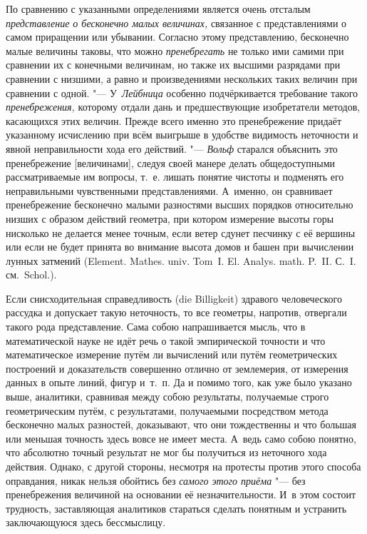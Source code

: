 По сравнению с указанными определениями является очень отсталым
{\em представление о бесконечно малых величинах,} связанное
с представлениями о самом приращении или убывании. Согласно этому представлению,
бесконечно малые величины таковы, что можно
{\em пренебрегать} не только ими самими при сравнении их с конечными величинам, но
также их высшими разрядами при сравнении с низшими, а равно и произведениями
нескольких таких величин при сравнении с одной. "--- У~{\em Лейбница} особенно
подчёркивается требование такого {\em пренебрежения,} которому отдали
дань и предшествующие изобретатели методов, касающихся этих величин. Прежде всего
именно это пренебрежение придаёт указанному исчислению при всём выигрыше в
удобстве видимость неточности и явной неправильности хода его действий. "---
{\em Вольф} старался объяснить это пренебрежение [величинами], следуя своей
манере делать общедоступными рассматриваемые им вопросы, т.~е. лишать
понятие чистоты и подменять его неправильными чувственными
представлениями. А~именно, он сравнивает пренебрежение бесконечно малыми
разностями высших порядков относительно низших с образом действий геометра,
при котором измерение высоты горы нисколько не делается менее точным, если ветер
сдунет песчинку с её вершины или если не будет принята во внимание высота домов и башен при
вычислении лунных затмений (Ele\-ment. Mathes. univ. Tom~I. El. Ana\-lys.
math. P.~II. С.~I. см.~Schol.).

Если снисходительная справедливость (die Billig\-keit) здравого человеческого
рассудка и допускает такую неточность, то все геометры, напротив, отвергали
такого рода представление. Сама собою напрашивается мысль, что в математической
науке не идёт речь о такой эмпирической точности и что математическое измерение
путём ли вычислений или путём геометрических построений и доказательств
совершенно отлично от землемерия, от измерения данных в опыте линий, фигур
и~т.~п. Да и помимо того, как уже было указано выше, аналитики, сравнивая между
собою результаты, получаемые строго геометрическим путём, с результатами,
получаемыми посредством метода бесконечно малых разностей, доказывают, что они
тождественны и что большая или меньшая точность здесь вовсе не имеет места.
А~ведь само собою понятно, что абсолютно точный результат не мог бы получиться
из неточного хода действия. Однако, с другой стороны, несмотря на протесты
против этого способа оправдания, никак нельзя обойтись без
{\em самого этого приёма} "--- без пренебрежения величиной на основании её
незначительности. И~в этом состоит трудность, заставляющая аналитиков стараться
сделать понятным и устранить заключающуюся здесь бессмыслицу.

